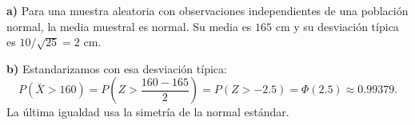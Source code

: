 \textbf{a)} Para una muestra aleatoria con observaciones
independientes de una población normal, la media muestral
es normal. Su media es $165$ cm y su desviación típica
es $10/\sqrt{25}=2$ cm.

\textbf{b)} Estandarizamos con esa desviación típica:
\[
P(\bar X>160)=P\left(Z>\frac{160-165}{2}\right)
=P(Z>-2.5)=\Phi(2.5)\approx\boxed{0.99379}.
\]
La última igualdad usa la simetría de la normal estándar.
